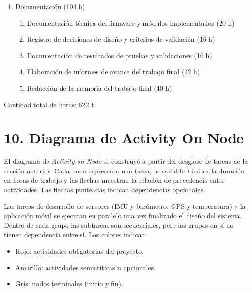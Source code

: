 \documentclass[
11pt, %
]{charter}
\begin{document}
\begin{enumerate}
	\begin{enumerate}
		\item Integración del sistema completo (40 h)
		\item Pruebas de comunicación entre sensores, microSD y Bluetooth (24 h)
		\item Ajustes de robustez y refinamiento del comportamiento del sistema (20 h)
		\item Verificación de registros generados y trazabilidad de datos (20 h)
		\item Pruebas funcionales de la aplicación móvil con datos simulados y reales (10 h)
	\end{enumerate}
	\item Documentación (104 h)
	\begin{enumerate}
		\item Documentación técnica del firmware y módulos implementados (20 h)
		\item Registro de decisiones de diseño y criterios de validación (16 h)
		\item Documentación de resultados de pruebas y validaciones (16 h)
		\item Elaboración de informes de avance del trabajo final (12 h)
		\item Redacción de la memoria del trabajo final (40 h)
	\end{enumerate}
\end{enumerate}

Cantidad total de horas: 622 h.


\section{10. Diagrama de Activity On Node}
\label{sec:AoN}

El diagrama de \textit{Activity on Node} se construyó a partir del desglose de tareas de la sección anterior. Cada nodo representa una tarea, la variable \textit{t} indica la duración en horas de trabajo y las flechas muestran la relación de precedencia entre actividades. Las flechas punteadas indican dependencias opcionales.

Las tareas de desarrollo de sensores (IMU y barómetro, GPS y temperatura) y la aplicación móvil se ejecutan en paralelo una vez finalizado el diseño del sistema. Dentro de cada grupo las subtareas son secuenciales, pero los grupos en sí no tienen dependencia entre sí. Los colores indican:

\begin{itemize}
  \item Rojo: actividades obligatorias del proyecto.
  \item Amarillo: actividades semicríticas u opcionales.
  \item Gris: nodos terminales (inicio y fin).
\end{itemize}
\end{document}
